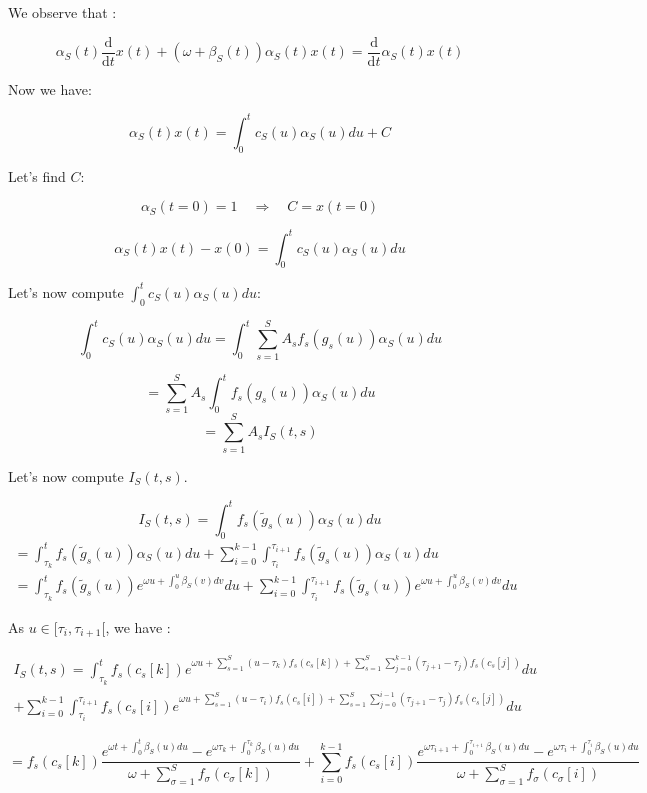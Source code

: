 \documentclass[journal]{IEEEtran}
\begin{document}
We observe that : 

\[
\alpha_S(t) \frac{\mathrm{d}}{\mathrm{d}t}x(t) + (\omega + \beta_S(t)) \alpha_S(t) x (t) = \frac{\mathrm{d} }{\mathrm{d}t}\alpha_S(t) x(t)
\]

Now we have:

\[
\alpha_S(t) x(t) = \int_0^t c_S(u) \alpha_S(u) du + C
\]

Let's find \(C\):

\[
\alpha_S(t = 0) = 1 \quad \Rightarrow \quad C = x (t = 0)
\]


\[
\alpha_S(t) x (t) - x (0) = \int_0^t c_S(u) \alpha_S(u) du
\]

Let's now compute \(\int_0^t c_S(u) \alpha_S(u) du\):



\[
\int_0^t c_S(u) \alpha_S(u) du = \int_0^t \sum_{s=1}^S A_s f_s(g_s(u))\alpha_S(u) du 
\]


\[
 = \sum_{s=1}^S A_s \int_0^t f_s(g_s(u))\alpha_S(u) du
\]
\[
 =  \sum_{s=1}^S A_s I_{S}(t, s)
\]


Let's now compute $I_{S}(t, s)$.




\[
 I_{S}(t,s) = \int_0^t f_s(\tilde{g}_s(u))\alpha_S(u) du
\]
\begin{multline*}
=\int_{\tau_k}^t  f_s(\tilde{g}_s(u))\alpha_S(u) du  + \sum_{i=0}^{k-1}\int_{\tau_i}^{\tau_{i+1} }f_s(\tilde{g}_s(u))\alpha_S(u) du 
\\
=\int_{\tau_k}^{t } f_s(\tilde{g}_s(u)) e^{\omega u + \int_0^u \beta_S(v) dv}du+ \sum_{i=0}^{k-1}\int_{\tau_i}^{\tau_{i+1} } f_s(\tilde{g}_s(u)) e^{\omega u + \int_0^u \beta_S(v) dv}du
\end{multline*}

As $u \in [\tau_i, \tau_{i+1}[$, we have :

\begin{multline*}
I_S(t, s)=\int_{\tau_k}^{t } f_s(c_s[k]) e^{\omega u + \sum_{s=1}^{S} (u-\tau_k)f_s(c_s[k]) + \sum_{s=1}^{S} \sum_{j=0}^{k-1} (\tau_{j+1}-\tau_j)f_s(c_s[j]) } du \\
+ \sum_{i=0}^{k-1} \int_{\tau_i}^{\tau_{i+1}} f_s(c_s[i]) e^{\omega u + \sum_{s=1}^{S} (u-\tau_i)f_s(c_s[i]) + \sum_{s=1}^{S} \sum_{j=0}^{i-1} (\tau_{j+1}-\tau_j)f_s(c_s[j])} du
\end{multline*}


\[
 = f_s(c_s[k]) \frac{e^{\omega t + \int_0^t\beta_S(u)du } - e^{\omega \tau_k + \int_0^{\tau_k}\beta_S(u)du  }}{\omega + \sum_{\sigma = 1}^{S}f_\sigma(c_{\sigma}[k]) } +\sum_{i=0}^{k-1} f_s(c_s[i]) \frac{e^{\omega\tau_{i+1}+ \int_0^{\tau_{i+1}}\beta_S(u)du}- e^{\omega \tau_i +  \int_0^{\tau_{i}}\beta_S(u)du}}{\omega + \sum_{\sigma = 1}^{S}f_\sigma(c_{\sigma}[i])}
\]
\end{document}
